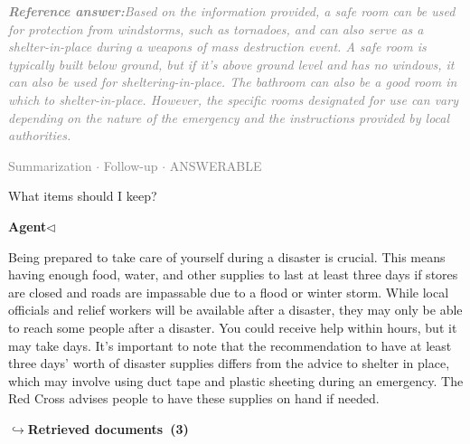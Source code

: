 \documentclass[a4paper,11pt]{article}
\begin{document}
\begin{refanswerenv}
{\footnotesize\textit{\textcolor{gray}{\textbf{Reference answer:}\enspace Based on the information provided, a safe room can be used for protection from windstorms, such as tornadoes, and can also serve as a shelter-in-place during a weapons of mass destruction event. A safe room is typically built below ground, but if it's above ground level and has no windows, it can also be used for sheltering-in-place. The bathroom can also be a good room in which to shelter-in-place. However, the specific rooms designated for use can vary depending on the nature of the emergency and the instructions provided by local authorities.}}}
\end{refanswerenv}
\vspace{0.5em}
\hfill{\tiny\textcolor{gray}{Summarization $\cdot$ Follow-up $\cdot$ ANSWERABLE}}
\begin{userbubble}
What items should I keep?
\end{userbubble}
\noindent\hfill{\small\textcolor{agentcolor}{\textbf{Agent\enspace$\triangleleft$}}}
\begin{agentbubble}
Being prepared to take care of yourself during a disaster is crucial. This means having enough food, water, and other supplies to last at least three days if stores are closed and roads are impassable due to a flood or winter storm. While local officials and relief workers will be available after a disaster, they may only be able to reach some people after a disaster. You could receive help within hours, but it may take days. It's important to note that the recommendation to have at least three days' worth of disaster supplies differs from the advice to shelter in place, which may involve using duct tape and plastic sheeting during an emergency. The Red Cross advises people to have these supplies on hand if needed.
\end{agentbubble}
\noindent\hfill{\footnotesize\textcolor{doccolor}{\textbf{$\hookrightarrow$\enspace Retrieved documents~(3)}}}
\end{document}
